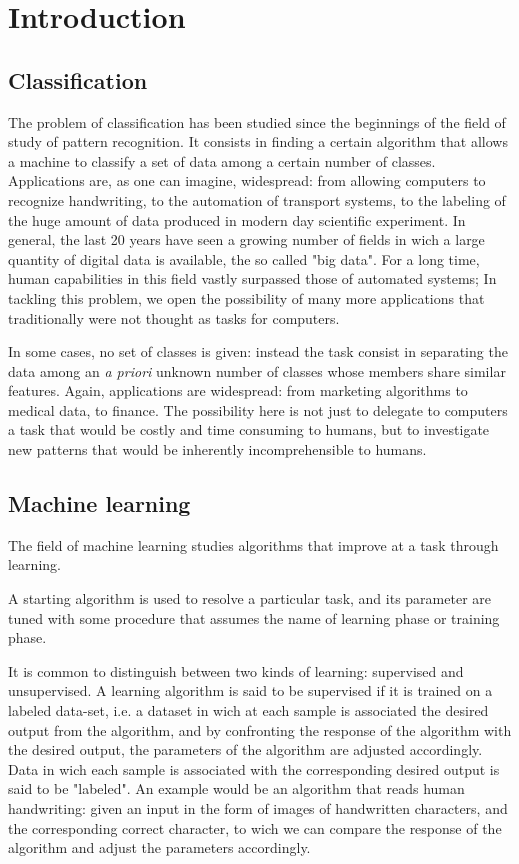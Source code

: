 \documentclass[a4paper]{report}
\begin{document}
\listoftodos

\chapter{Introduction}
\section{Classification}
The problem of classification has been studied since the beginnings of the field of study of pattern recognition. It consists in finding a certain algorithm that allows a machine to classify a set of data among a certain number of classes. Applications are, as one can imagine, widespread: from allowing computers to recognize handwriting, to the automation of transport systems, to the labeling of the huge amount of data produced in modern day scientific experiment. In general, the last 20 years have seen a growing number of fields in wich a large quantity of digital data is available, the so called "big data". For a long time, human capabilities in this field vastly surpassed those of automated systems; In tackling this problem, we open the possibility of many more applications that traditionally were not thought as  tasks for computers.

In some cases, no set of classes is given: instead the task consist in separating the data among an \textit{a priori} unknown number of classes whose members share similar features. Again, applications are widespread: from marketing algorithms to medical data, to finance. The possibility here is not just to delegate to computers a task that would be costly and time consuming to humans, but to investigate new patterns that would be inherently incomprehensible to humans.


\section{Machine learning}
The field of machine learning studies algorithms that improve at a task through learning.

A starting algorithm is used to resolve a particular task, and its parameter are tuned with some procedure that assumes the name of learning phase or training phase.

It is common to distinguish between two kinds of learning: supervised and unsupervised. A learning algorithm is said to be supervised if it is trained on a labeled data-set, i.e. a dataset in wich at each sample is associated the desired output from the algorithm, and by confronting the response of the algorithm with the desired output, the parameters of the algorithm are adjusted accordingly. Data in wich each sample is associated with the corresponding desired output is said to be "labeled".  An example would be an algorithm that reads human handwriting: given an input in the form of images of handwritten characters, and the corresponding correct character, to wich we can compare the response of the algorithm and adjust the parameters accordingly.
\end{document}
